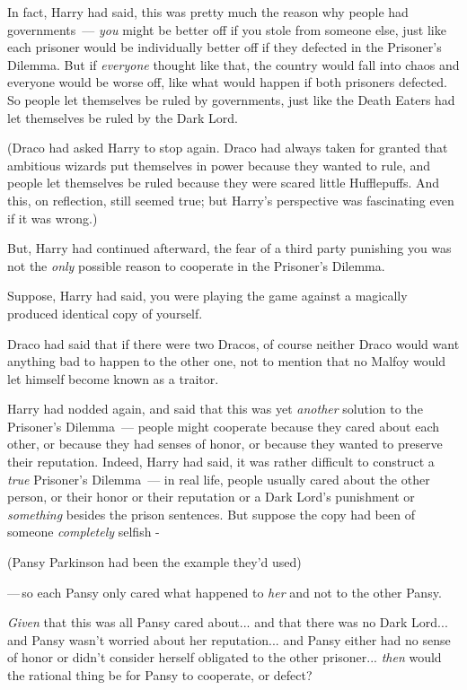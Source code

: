 In fact, Harry had said, this was pretty much the reason why people had governments~--- \emph{you} might be better off if you stole from someone else, just like each prisoner would be individually better off if they defected in the Prisoner's Dilemma. But if \emph{everyone} thought like that, the country would fall into chaos and everyone would be worse off, like what would happen if both prisoners defected. So people let themselves be ruled by governments, just like the Death Eaters had let themselves be ruled by the Dark Lord.

(Draco had asked Harry to stop again. Draco had always taken for granted that ambitious wizards put themselves in power because they wanted to rule, and people let themselves be ruled because they were scared little Hufflepuffs. And this, on reflection, still seemed true; but Harry's perspective was fascinating even if it was wrong.)

But, Harry had continued afterward, the fear of a third party punishing you was not the \emph{only} possible reason to cooperate in the Prisoner's Dilemma.

Suppose, Harry had said, you were playing the game against a magically produced identical copy of yourself.

Draco had said that if there were two Dracos, of course neither Draco would want anything bad to happen to the other one, not to mention that no Malfoy would let himself become known as a traitor.

Harry had nodded again, and said that this was yet \emph{another} solution to the Prisoner's Dilemma~--- people might cooperate because they cared about each other, or because they had senses of honor, or because they wanted to preserve their reputation. Indeed, Harry had said, it was rather difficult to construct a \emph{true} Prisoner's Dilemma~--- in real life, people usually cared about the other person, or their honor or their reputation or a Dark Lord's punishment or \emph{something} besides the prison sentences. But suppose the copy had been of someone \emph{completely} selfish -

(Pansy Parkinson had been the example they'd used)

---\,so each Pansy only cared what happened to \emph{her} and not to the other Pansy.

\emph{Given} that this was all Pansy cared about... and that there was no Dark Lord... and Pansy wasn't worried about her reputation... and Pansy either had no sense of honor or didn't consider herself obligated to the other prisoner... \emph{then} would the rational thing be for Pansy to cooperate, or defect?

